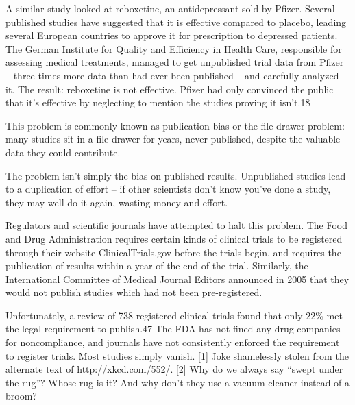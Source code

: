 A similar study looked at reboxetine, an antidepressant sold by Pfizer. Several published studies have suggested that it is effective compared to placebo, leading several European countries to approve it for prescription to depressed patients. The German Institute for Quality and Efficiency in Health Care, responsible for assessing medical treatments, managed to get unpublished trial data from Pfizer – three times more data than had ever been published – and carefully analyzed it. The result: reboxetine is not effective. Pfizer had only convinced the public that it’s effective by neglecting to mention the studies proving it isn’t.18

This problem is commonly known as publication bias or the file-drawer problem: many studies sit in a file drawer for years, never published, despite the valuable data they could contribute.

The problem isn’t simply the bias on published results. Unpublished studies lead to a duplication of effort – if other scientists don’t know you’ve done a study, they may well do it again, wasting money and effort.

Regulators and scientific journals have attempted to halt this problem. The Food and Drug Administration requires certain kinds of clinical trials to be registered through their website ClinicalTrials.gov before the trials begin, and requires the publication of results within a year of the end of the trial. Similarly, the International Committee of Medical Journal Editors announced in 2005 that they would not publish studies which had not been pre-registered.

Unfortunately, a review of 738 registered clinical trials found that only 22\% met the legal requirement to publish.47 The FDA has not fined any drug companies for noncompliance, and journals have not consistently enforced the requirement to register trials. Most studies simply vanish.
[1]	Joke shamelessly stolen from the alternate text of http://xkcd.com/552/.
[2]	Why do we always say “swept under the rug”? Whose rug is it? And why don’t they use a vacuum cleaner instead of a broom?